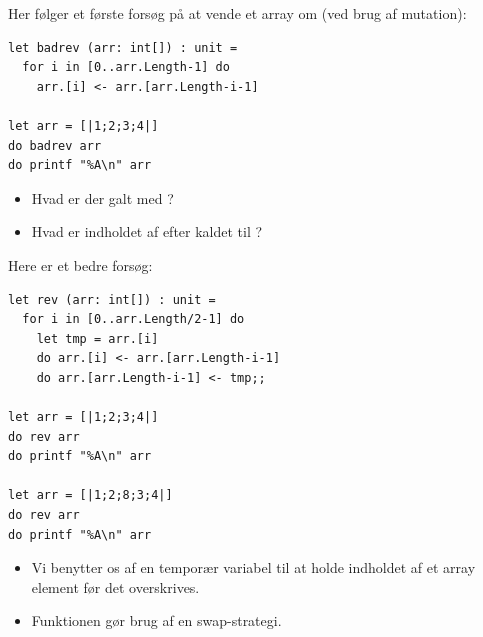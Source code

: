 \documentclass[rgb]{beamer}
\begin{document}
\begin{frame}[fragile]
\begin{footnotesize}
\vspace{1ex}

Her følger et første forsøg på at vende et array om (ved brug af
mutation):

\begin{lstlisting}[numbers=none,frame=none]
let badrev (arr: int[]) : unit =
  for i in [0..arr.Length-1] do
    arr.[i] <- arr.[arr.Length-i-1]

let arr = [|1;2;3;4|]
do badrev arr
do printf "%A\n" arr
\end{lstlisting}

\begin{itemize}
\item Hvad er der galt med ?
\item Hvad er indholdet af  efter kaldet til ?
\end{itemize}

\end{footnotesize}
\end{frame}

\begin{frame}[fragile]
\begin{footnotesize}
\vspace{1ex}

Here er et bedre forsøg:

\begin{lstlisting}[numbers=none,frame=none]
let rev (arr: int[]) : unit =
  for i in [0..arr.Length/2-1] do
    let tmp = arr.[i]
    do arr.[i] <- arr.[arr.Length-i-1]
    do arr.[arr.Length-i-1] <- tmp;;

let arr = [|1;2;3;4|]
do rev arr
do printf "%A\n" arr

let arr = [|1;2;8;3;4|]
do rev arr
do printf "%A\n" arr
\end{lstlisting}

\begin{itemize}
\item Vi benytter os af en temporær variabel til at holde indholdet af
  et array element før det overskrives.
\item Funktionen gør brug af en swap-strategi.
\end{itemize}

\end{footnotesize}
\end{frame}
\end{document}
